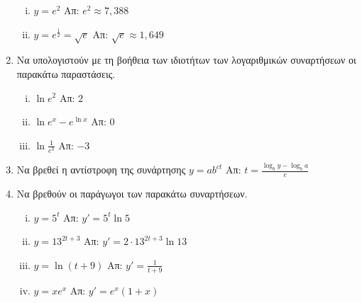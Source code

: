 \begin{enumerate}
    \begin{enumerate}[i)]
      \item $ y=e^{2} $ \hfill Απ: $ e^{2} \approx 7,388 $ 
      \item $ y=e^{\frac{1}{2}}= \sqrt{e} $ \hfill Απ: $ \sqrt{e} \approx 1,649 $ 
    \end{enumerate}

  \item Να υπολογιστούν με τη βοήθεια των ιδιοτήτων των λογαριθμικών συναρτήσεων οι παρακάτω
    παραστάσεις.

    \begin{enumerate}[i)]
      \item $ \ln{e^{2}} $ \hfill Απ: $ 2 $ 
      \item $ \ln{e^{x}} - e^{\ln{x}} $ \hfill Απ: $ 0  $ 
      \item $ \ln{\frac{1}{e^{3}}} $ \hfill Απ: $ -3 $ 
    \end{enumerate}

  \item Να βρεθεί η αντίστροφη της συνάρτησης $ y = ab^{ct}$ \hfill Απ: $ t = \frac{\log_{b}{y} -
    \log_{b}{a}}{c} $ 

  \item Να βρεθούν οι παράγωγοι των παρακάτω συναρτήσεων.

    \begin{enumerate}[i)]
      \item $ y = 5^{t} $ \hfill Απ: $ y'=5^{t} \ln{5} $
      \item $ y = 13^{2t+3} $ \hfill Απ: $ y' = 2\cdot 13^{2t+3} \ln{13}  $ 
      \item $ y = \ln{(t+9)} $ \hfill Απ: $y'= \frac{1}{t+9} $
      \item $ y = xe^{x} $ \hfill Απ: $ y'=e^{x}(1+x) $ 
    \end{enumerate}
\end{enumerate}


  

